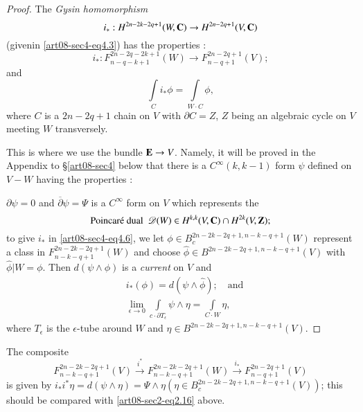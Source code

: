 \begin{proof}
The {\em Gysin homomorphism}
\begin{equation}
i_{*}:H^{2n-2k-2q+1}(W,\mathbf{C})\to H^{2n-2q+1}(V,\mathbf{C})\label{art08-sec4-eq4.5}
\end{equation}
(given\pageoriginale in \eqref{art08-sec4-eq4.3}) has the properties :
\begin{equation}
i_{*}:F^{2n-2q-2k+1}_{n-q-k+1}(W)\to F^{2n-2q+1}_{n-q+1}(V);\label{art08-sec4-eq4.6}
\end{equation}
and
\begin{equation}
\int\limits_{C}i_{*}\phi=\int\limits_{W\cdot C}\phi,\label{art08-sec4-eq4.7}
\end{equation}
where $C$ is a $2n-2q+1$ chain on $V$ with $\partial C=Z$, $Z$ being an algebraic cycle on $V$ meeting $W$ transversely.

This is where we use the bundle $\mathbf{E}\to V$. Namely, it will be proved in the Appendix to \S\ref{art08-sec4} below that there is a $C^{\infty}(k,k-1)$ form $\psi$ defined on $V-W$ having the properties :

$\partial \psi=0$ and $\overline{\partial}\psi=\Psi$ is a $C^{\infty}$ form on $V$ which represents the
\begin{equation}
\text{Poincar\'e dual~ } \mathscr{D}(W)\in H^{k,k}(V,\mathbf{C})\cap H^{2k}(V,\mathbf{Z});\label{art08-sec4-eq4.8}
\end{equation}
to give $i_{*}$ in \eqref{art08-sec4-eq4.6}, we let $\phi\in B^{2n-2k-2q+1,n-k-q+1}_{c}(W)$ represent a class in $F^{2n-2k-2q+1}_{n-k-q+1}(W)$ and choose $\widehat{\phi}\in B^{2n-2k-2q+1,n-k-q+1}(V)$ with $\widehat{\phi}|W=\phi$. Then $d(\psi\wedge \phi)$ is a {\em current} on $V$ and
\begin{align}
& i_{*}(\phi)=d(\psi\wedge\widehat{\phi});\quad\text{and}\label{art08-sec4-eq4.9}\\
& \lim\limits_{\epsilon \to 0}\int\limits_{c\cdot \partial T_{\epsilon}}\psi\wedge\eta =\int\limits_{C\cdot W}\eta,\label{art08-sec4-eq4.10}
\end{align}
where $T_{\epsilon}$ is the $\epsilon$-tube around $W$ and $\eta\in B^{2n-2k-2q+1,n-k-q+1}(V)$.
\end{proof}

\begin{remark*}
The composite
\begin{equation}
F^{2n-2k-2q+1}_{n-k-q+1}(V)\xrightarrow{i^{*}}F^{2n-2k-2q+1}_{n-k-q+1}(W)\xrightarrow{i_{*}}F^{2n-2q+1}_{n-q+1}(V)\label{art08-sec4-eq4.11}
\end{equation}
is given by $i_{*}i^{*}\eta=d(\psi\wedge \eta)=\Psi\wedge \eta(\eta\in B^{2n-2k-2q+1,n-k-q+1}_{c}(V))$; this should be compared with \eqref{art08-sec2-eq2.16} above.
\end{remark*}

